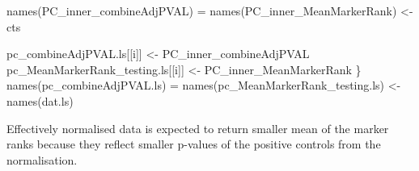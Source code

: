 \documentclass[]{article}
\newcommand{\hlstd}[1]{\textcolor[rgb]{0.251,0.251,0.251}{#1}}%
\newenvironment{Shaded}{\begin{myshaded}}{\end{myshaded}}
\newcommand{\OtherTok}[1]{{#1}}
\newcommand{\FunctionTok}[1]{\hlstd{#1}}
\newcommand{\NormalTok}[1]{\hlstd{#1}}
\begin{document}
\begin{Shaded}
\begin{Highlighting}[]
    \FunctionTok{names}\NormalTok{(PC\_inner\_combineAdjPVAL) }\OtherTok{=} \FunctionTok{names}\NormalTok{(PC\_inner\_MeanMarkerRank) }\OtherTok{\textless{}{-}}\NormalTok{ cts}

\NormalTok{    pc\_combineAdjPVAL.ls[[i]] }\OtherTok{\textless{}{-}}\NormalTok{ PC\_inner\_combineAdjPVAL}
\NormalTok{    pc\_MeanMarkerRank\_testing.ls[[i]] }\OtherTok{\textless{}{-}}\NormalTok{ PC\_inner\_MeanMarkerRank}
\NormalTok{\}}
\FunctionTok{names}\NormalTok{(pc\_combineAdjPVAL.ls) }\OtherTok{=} \FunctionTok{names}\NormalTok{(pc\_MeanMarkerRank\_testing.ls) }\OtherTok{\textless{}{-}} \FunctionTok{names}\NormalTok{(dat.ls)}
\end{Highlighting}
\end{Shaded}

Effectively normalised data is expected to return smaller mean of the marker ranks because they reflect smaller p-values of the positive controls from the normalisation.
\end{document}
